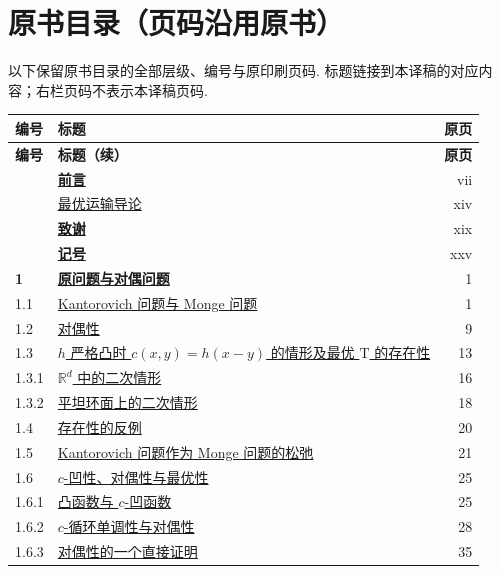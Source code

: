\clearpage
\section*{原书目录（页码沿用原书）}\label{sec:source-contents}
以下保留原书目录的全部层级、编号与原印刷页码. 标题链接到本译稿的对应内容；右栏页码不表示本译稿页码.
\begingroup
\small
\renewcommand{\arraystretch}{1.08}
\begin{longtable}{@{}p{1.4cm}p{11.2cm}r@{}}
\textbf{编号}&\textbf{标题}&\textbf{原页}\\\hline
\endfirsthead
\textbf{编号}&\textbf{标题（续）}&\textbf{原页}\\\hline
\endhead
&\hyperref[sec:preface]{\textbf{前言}}&vii\\
&\hyperref[sec:introduction]{\hspace{1em}最优运输导论}&xiv\\
&\hyperref[sec:acknowledgments]{\textbf{致谢}}&xix\\
&\hyperref[sec:notation]{\textbf{记号}}&xxv\\
\textbf{1}&\hyperref[sec:1]{\textbf{原问题与对偶问题}}&1\\
1.1&\hyperref[sec:1.1]{Kantorovich 问题与 Monge 问题}&1\\
1.2&\hyperref[sec:1.2]{对偶性}&9\\
1.3&\hyperref[sec:1.3]{$h$ 严格凸时 $c(x,y)=h(x-y)$ 的情形及最优 $\mathrm T$ 的存在性}&13\\
1.3.1&\hyperref[sec:1.3.1]{\hspace{1em}$\mathbb R^d$ 中的二次情形}&16\\
1.3.2&\hyperref[sec:1.3.2]{\hspace{1em}平坦环面上的二次情形}&18\\
1.4&\hyperref[sec:1.4]{存在性的反例}&20\\
1.5&\hyperref[sec:1.5]{Kantorovich 问题作为 Monge 问题的松弛}&21\\
1.6&\hyperref[sec:1.6]{$c$-凹性、对偶性与最优性}&25\\
1.6.1&\hyperref[sec:1.6.1]{\hspace{1em}凸函数与 $c$-凹函数}&25\\
1.6.2&\hyperref[sec:1.6.2]{\hspace{1em}$c$-循环单调性与对偶性}&28\\
1.6.3&\hyperref[sec:1.6.3]{\hspace{1em}对偶性的一个直接证明}&35\\

\end{longtable}
